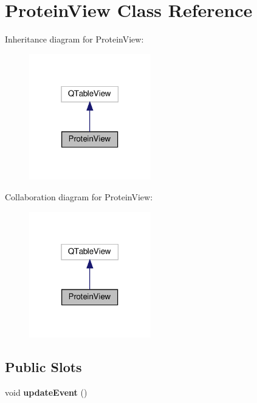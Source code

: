 \hypertarget{class_protein_view}{}\section{Protein\+View Class Reference}
\label{class_protein_view}


Inheritance diagram for Protein\+View\+:\nopagebreak
\begin{figure}[H]
\begin{center}
\leavevmode
\includegraphics[width=150pt]{class_protein_view__inherit__graph}
\end{center}
\end{figure}


Collaboration diagram for Protein\+View\+:\nopagebreak
\begin{figure}[H]
\begin{center}
\leavevmode
\includegraphics[width=150pt]{class_protein_view__coll__graph}
\end{center}
\end{figure}
\subsection*{Public Slots}
\begin{DoxyCompactItemize}
\item 
\mbox{\label{class_protein_view_af352ac170651ea7d1ed401200a14c2c8}} 
void {\bfseries update\+Event} ()
\end{DoxyCompactItemize}
